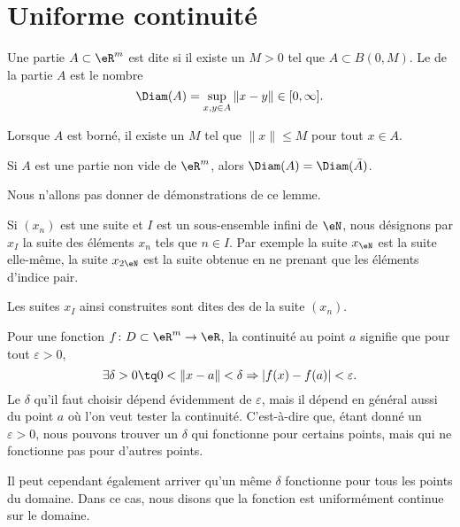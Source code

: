 \section{Uniforme continuité}		\label{SecUnifContinue}

\begin{definition}
	Une partie $A\subset\eR^m$ est dite  si il existe un $M>0$ tel que $A\subset B(0,M)$. Le  de la partie $A$ est le nombre
	\begin{equation}
		\Diam(A)=\sup_{x,y\in A}\| x-y \|\in\mathopen[ 0 , \infty \mathclose].
	\end{equation}
\end{definition}
Lorsque $A$ est borné, il existe un $M$ tel que $\| x \|\leq M$ pour tout $x\in A$.

\begin{lemma}
	Si $A$ est une partie non vide de $\eR^m$, alors $\Diam(A)=\Diam(\bar A)$.
\end{lemma}
Nous n'allons pas donner de démonstrations de ce lemme.


Si $(x_n)$ est une suite et $I$ est un sous-ensemble infini de $\eN$, nous désignons par $x_I$ la suite des éléments $x_n$ tels que $n\in I$. Par exemple la suite $x_{\eN}$ est la suite elle-même, la suite $x_{2\eN}$ est la suite obtenue en ne prenant que les éléments d'indice pair.

Les suites $x_I$ ainsi construites sont dites des  de la suite $(x_n)$.


Pour une fonction $f\colon D\subset\eR^m\to \eR$, la continuité au point $a$ signifie que pour tout $\varepsilon>0$,
\begin{equation}
	\exists\delta>0\tq 0<\| x-a \|<\delta\Rightarrow | f(x)-f(a) |<\varepsilon.
\end{equation}
Le $\delta$ qu'il faut choisir dépend évidemment de $\varepsilon$, mais il dépend en général aussi du point $a$ où l'on veut tester la continuité. C'est-à-dire que, étant donné un $\varepsilon>0$, nous pouvons trouver un $\delta$ qui fonctionne pour certains points, mais qui ne fonctionne pas pour d'autres points.

Il peut cependant également arriver qu'un même $\delta$ fonctionne pour tous les points du domaine. Dans ce cas, nous disons que la fonction est uniformément continue sur le domaine.

